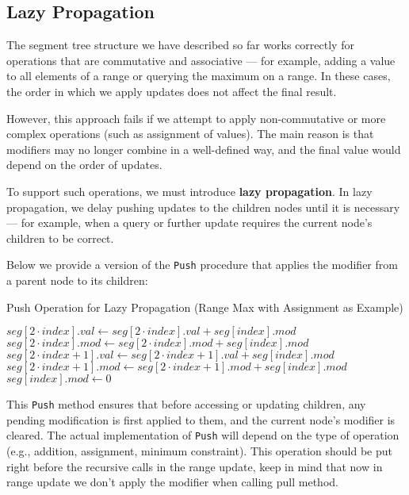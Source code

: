 \documentclass{article}
\begin{document}
\subsection{Lazy Propagation}

The segment tree structure we have described so far works correctly for operations that are commutative and associative --- for example, adding a value to all elements of a range or querying the maximum on a range. In these cases, the order in which we apply updates does not affect the final result.

However, this approach fails if we attempt to apply non-commutative or more complex operations (such as assignment of values). The main reason is that modifiers may no longer combine in a well-defined way, and the final value would depend on the order of updates.

To support such operations, we must introduce \textbf{lazy propagation}. In lazy propagation, we delay pushing updates to the children nodes until it is necessary --- for example, when a query or further update requires the current node's children to be correct.

\vspace{1em}

\noindent Below we provide a version of the \texttt{Push} procedure that applies the modifier from a parent node to its children:

\begin{algorithm}[H]
    \caption{Push Operation for Lazy Propagation (Range Max with Assignment as Example)}
    \begin{algorithmic}
                \State $seg[2 \cdot index].val \gets seg[2 \cdot index].val + seg[index].mod$
                \State $seg[2 \cdot index].mod \gets seg[2 \cdot index].mod + seg[index].mod$
                \State $seg[2 \cdot index + 1].val \gets seg[2 \cdot index + 1].val + seg[index].mod$
                \State $seg[2 \cdot index + 1].mod \gets seg[2 \cdot index + 1].mod + seg[index].mod$
                \State $seg[index].mod \gets 0$
            \EndIf
        \EndProcedure
    \end{algorithmic}
\end{algorithm}

\noindent
This \texttt{Push} method ensures that before accessing or updating children, any pending modification is first applied to them, and the current node's modifier is cleared. The actual implementation of \texttt{Push} will depend on the type of operation (e.g., addition, assignment, minimum constraint).
This operation should be put right before the recursive calls in the range update, keep in mind that now in range update we don't apply the modifier when calling pull method.
\end{document}

